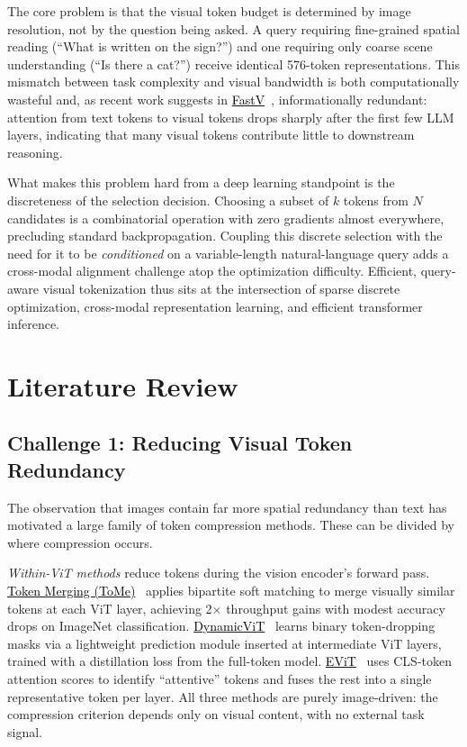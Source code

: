 \documentclass[11pt,twocolumn]{article}
\newcommand{\paperhref}[2]{\href{#1}{\textcolor{black}{#2}}}
\begin{document}
The core problem is that the visual token budget is determined by image resolution, not by the question being asked. A query requiring fine-grained spatial reading (``What is written on the sign?'') and one requiring only coarse scene understanding (``Is there a cat?'') receive identical 576-token representations. This mismatch between task complexity and visual bandwidth is both computationally wasteful and, as recent work suggests in \paperhref{https://arxiv.org/abs/2410.04417}{FastV}~\cite{chen2024fastv}, informationally redundant: attention from text tokens to visual tokens drops sharply after the first few LLM layers, indicating that many visual tokens contribute little to downstream reasoning.

What makes this problem hard from a deep learning standpoint is the discreteness of the selection decision. Choosing a subset of $k$ tokens from $N$ candidates is a combinatorial operation with zero gradients almost everywhere, precluding standard backpropagation. Coupling this discrete selection with the need for it to be \emph{conditioned} on a variable-length natural-language query adds a cross-modal alignment challenge atop the optimization difficulty. Efficient, query-aware visual tokenization thus sits at the intersection of sparse discrete optimization, cross-modal representation learning, and efficient transformer inference.

\section{Literature Review}
\label{sec:litreview}

\subsection{Challenge 1: Reducing Visual Token Redundancy}

The observation that images contain far more spatial redundancy than text has motivated a large family of token compression methods. These can be divided by where compression occurs.

\emph{Within-ViT methods} reduce tokens during the vision encoder's forward pass. \paperhref{https://arxiv.org/abs/2210.09461}{Token Merging (ToMe)}~\cite{bolya2022token} applies bipartite soft matching to merge visually similar tokens at each ViT layer, achieving 2$\times$ throughput gains with modest accuracy drops on ImageNet classification. \paperhref{https://arxiv.org/abs/2106.02034}{DynamicViT}~\cite{rao2021dynamicvit} learns binary token-dropping masks via a lightweight prediction module inserted at intermediate ViT layers, trained with a distillation loss from the full-token model. \paperhref{https://arxiv.org/abs/2202.07800}{EViT}~\cite{liang2022evit} uses CLS-token attention scores to identify ``attentive'' tokens and fuses the rest into a single representative token per layer. All three methods are purely image-driven: the compression criterion depends only on visual content, with no external task signal.
\end{document}
